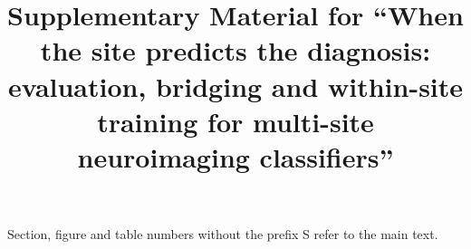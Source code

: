 \documentclass[11pt]{article}
\title{Supplementary Material for ``When the site predicts the diagnosis: evaluation, bridging and within-site training for multi-site neuroimaging classifiers''}
\date{}
\begin{document}
\maketitle
\noindent Section, figure and table numbers without the prefix S refer to the main text.








\end{document}
